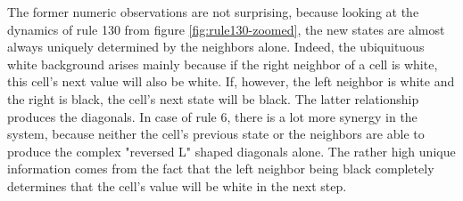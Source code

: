 \documentclass[12pt]{article}
\begin{document}
The former numeric observations are not surprising, because looking at the dynamics of rule 130 from figure \ref{fig:rule130-zoomed}, the new states are almost always uniquely determined by the neighbors alone. Indeed, the ubiquituous white background arises mainly because if the right neighbor of a cell is white, this cell's next value will also be white. If, however, the left neighbor is white and the right is black, the cell's next state will be black. The latter relationship produces the diagonals. In case of rule 6, there is a lot more synergy in the system, because neither the cell's previous state or the neighbors are able to produce the complex "reversed L" shaped diagonals alone. The rather high unique information comes from the fact that the left neighbor being black completely determines that the cell's value will be white in the next step. 
\end{document}
